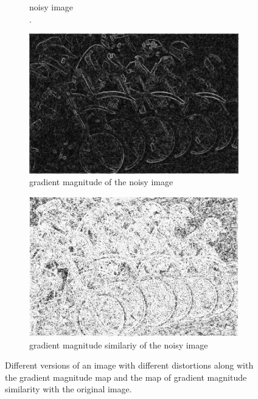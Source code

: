 \begin{figure}
\begin{subfigure}[b]{0.3\textwidth}
         \caption{noisy image\\.}
         \label{fig:gmsd_noise_gry}
     \end{subfigure}
     \hfill
     \begin{subfigure}[b]{0.3\textwidth}
         \centering
         \includegraphics[width=\textwidth]{./figs/noise_mag}
         \caption{gradient magnitude of the noisy image}
         \label{fig:gmsd_noise_mag}
     \end{subfigure}
     \hfill
     \begin{subfigure}[b]{0.3\textwidth}
         \centering
         \includegraphics[width=\textwidth]{./figs/noise_sim}
         \caption{gradient magnitude similariy of the noisy image}
         \label{fig:gmsd_noise_sim}
     \end{subfigure}
        \caption{Different versions of an image with different distortions along with the gradient magnitude map and the map of gradient magnitude similarity with the original image.}
        \label{fig:gmsd}
\end{figure}
